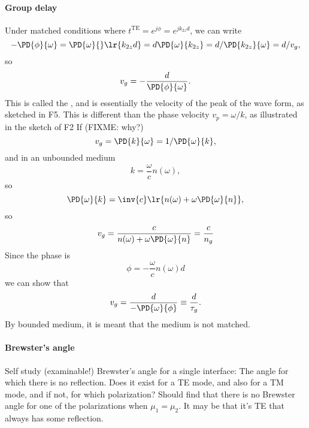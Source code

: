 \paragraph{Group delay}
%
Under matched conditions where \( t^{\textrm{TE}} = e^{j \phi} = e^{j k_{2z} d} \), we can write
%
\begin{dmath}\label{eqn:emtLecture10:520}
- \PD{\phi}{\omega}
= \PD{\omega}{} \lr{ k_{2z} d }
= d \PD{\omega}{k_{2z}}
= d /\PD{k_{2z}}{\omega}
= d / v_g,
\end{dmath}
%
so
%
\begin{dmath}\label{eqn:emtLecture10:540}
v_g = -\frac{d}{\PD{\phi}{\omega}}.
\end{dmath}
%
This is called the , and is essentially the velocity of the peak of the wave form, as sketched in
%
F5.
%
This is different than the phase velocity \( v_p = \omega/k \), as illustrated in the sketch of
%
F2
%
If (FIXME: why?)
%
\begin{dmath}\label{eqn:emtLecture10:660}
v_g
= \PD{k}{\omega}
= 1/\PD{\omega}{k},
\end{dmath}
%
and in an unbounded medium
\begin{dmath}\label{eqn:emtLecture10:560}
   k = \frac{\omega}{c} n(\omega),
\end{dmath}
%
so
\begin{dmath}\label{eqn:emtLecture10:580}
\PD{\omega}{k}
=
\inv{c} \lr{ n(\omega) + \omega \PD{\omega}{n} },
\end{dmath}
%
so
\begin{equation}\label{eqn:emtLecture10:600}
v_g
= \frac{c}{n(\omega) + \omega \PD{\omega}{n} }
= \frac{c}{n_g}
\end{equation}
%
Since the phase is
%
\begin{dmath}\label{eqn:emtLecture10:680}
\phi = -\frac{\omega}{c} n(\omega) d
\end{dmath}
%
we can show that
\begin{dmath}\label{eqn:emtLecture10:700}
v_g
= \frac{d}{-\PD{\omega}{\phi}}
\equiv
\frac{d}{\tau_g}.
\end{dmath}
%
By bounded medium, it is meant that the medium is not matched.
%
\paragraph{Brewster's angle}
%
Self study (examinable!) Brewster's angle for a single interface: The angle for which there is no reflection.
%
Does it exist for a TE mode, and also for a TM mode, and if not, for which polarization?
%
Should find that there is no Brewster angle for one of the polarizations when \( \mu_1 = \mu_2 \).  It may be that it's TE that always has some reflection.
%
